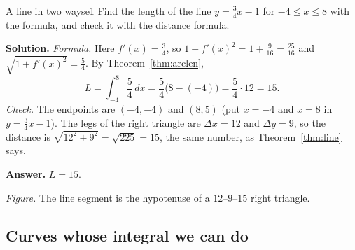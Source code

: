 \documentclass[11pt]{article}
\begin{document}
\begin{exmp}{A line in two ways}{e1}
Find the length of the line $y=\frac34x-1$ for $-4\le x\le8$ with the formula, and check it with the distance formula.

\textbf{Solution.} \emph{Formula.} Here $f'(x)=\frac34$, so $1+f'(x)^2=1+\frac9{16}=\frac{25}{16}$ and $\sqrt{1+f'(x)^2}=\frac54$. By Theorem~\ref{thm:arclen},
\[
L=\int_{-4}^8\frac54\,dx=\frac54\bigl(8-(-4)\bigr)=\frac54\cdot12=15 .
\]
\emph{Check.} The endpoints are $(-4,-4)$ and $(8,5)$ (put $x=-4$ and $x=8$ in $y=\frac34x-1$). The legs of the right triangle are $\Delta x=12$ and $\Delta y=9$, so the distance is $\sqrt{12^2+9^2}=\sqrt{225}=15$, the same number, as Theorem~\ref{thm:line} says.

\textbf{Answer.} $L=15$.
\begin{center}
\par\small\emph{Figure.} The line segment is the hypotenuse of a $12$--$9$--$15$ right triangle.
\end{center}
\end{exmp}

\subsection*{Curves whose integral we can do}
\end{document}
